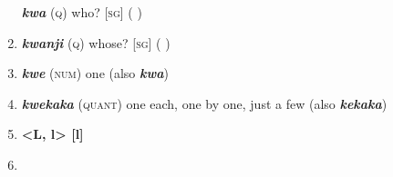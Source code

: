 \begin{enumerate}[noitemsep, label={}, align=left, widest=190, labelsep=1ex,leftmargin=*,itemindent=-10pt]
\textbf{\textit{kwa}} (\textsc{q}) who? [\textsc{sg}] ( ) \item 
\textbf{\textit{kwanji}} (\textsc{q}) whose? [\textsc{sg}] ( ) \item 
\textbf{\textit{kwe}} (\textsc{num}) one (also \textbf{\textit{kwa}}) \item 
\textbf{\textit{kwekaka}} (\textsc{quant}) one each, one by one, just a few (also \textbf{\textit{kekaka}})\\ \item 

\newpage

\noindent \textbf{<L, l>        [l]}\\ \item 


\end{enumerate}
